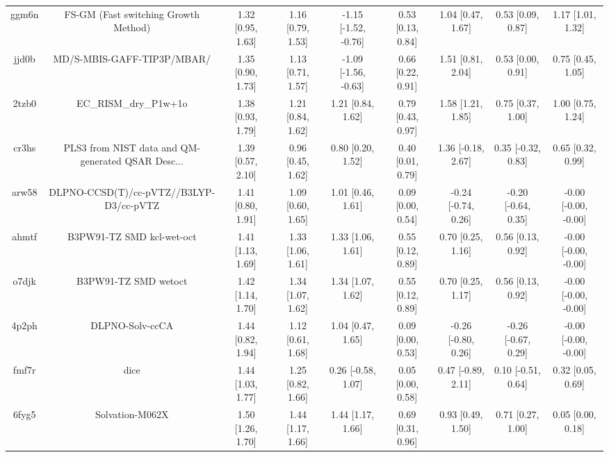\documentclass{article}
\begin{document}
\begin{center}
\begin{longtable}{|ccccccccc|}
 ggm6n &               FS-GM (Fast switching Growth Method) &  1.32 [0.95, 1.63] &  1.16 [0.79, 1.53] &  -1.15 [-1.52, -0.76] &  0.53 [0.13, 0.84] &    1.04 [0.47, 1.67] &    0.53 [0.09, 0.87] &     1.17 [1.01, 1.32] \\
 jjd0b &                         MD/S-MBIS-GAFF-TIP3P/MBAR/ &  1.35 [0.90, 1.73] &  1.13 [0.71, 1.57] &  -1.09 [-1.56, -0.63] &  0.66 [0.22, 0.91] &    1.51 [0.81, 2.04] &    0.53 [0.00, 0.91] &     0.75 [0.45, 1.05] \\
 2tzb0 &                              EC\_RISM\_dry\_P1w+1o &  1.38 [0.93, 1.79] &  1.21 [0.84, 1.62] &     1.21 [0.84, 1.62] &  0.79 [0.43, 0.97] &    1.58 [1.21, 1.85] &    0.75 [0.37, 1.00] &     1.00 [0.75, 1.24] \\
 cr3hs &  PLS3 from NIST data and QM-generated QSAR Desc... &  1.39 [0.57, 2.10] &  0.96 [0.45, 1.62] &     0.80 [0.20, 1.52] &  0.40 [0.01, 0.79] &   1.36 [-0.18, 2.67] &   0.35 [-0.32, 0.83] &     0.65 [0.32, 0.99] \\
 arw58 &            DLPNO-CCSD(T)/cc-pVTZ//B3LYP-D3/cc-pVTZ &  1.41 [0.80, 1.91] &  1.09 [0.60, 1.65] &     1.01 [0.46, 1.61] &  0.09 [0.00, 0.54] &  -0.24 [-0.74, 0.26] &  -0.20 [-0.64, 0.35] &  -0.00 [-0.00, -0.00] \\
 ahmtf &                          B3PW91-TZ SMD kcl-wet-oct &  1.41 [1.13, 1.69] &  1.33 [1.06, 1.61] &     1.33 [1.06, 1.61] &  0.55 [0.12, 0.89] &    0.70 [0.25, 1.16] &    0.56 [0.13, 0.92] &  -0.00 [-0.00, -0.00] \\
 o7djk &                               B3PW91-TZ SMD wetoct &  1.42 [1.14, 1.70] &  1.34 [1.07, 1.62] &     1.34 [1.07, 1.62] &  0.55 [0.12, 0.89] &    0.70 [0.25, 1.17] &    0.56 [0.13, 0.92] &  -0.00 [-0.00, -0.00] \\
 4p2ph &                                    DLPNO-Solv-ccCA &  1.44 [0.82, 1.94] &  1.12 [0.61, 1.68] &     1.04 [0.47, 1.65] &  0.09 [0.00, 0.53] &  -0.26 [-0.80, 0.26] &  -0.26 [-0.67, 0.29] &  -0.00 [-0.00, -0.00] \\
 fmf7r &                                               dice &  1.44 [1.03, 1.77] &  1.25 [0.82, 1.66] &    0.26 [-0.58, 1.07] &  0.05 [0.00, 0.58] &   0.47 [-0.89, 2.11] &   0.10 [-0.51, 0.64] &     0.32 [0.05, 0.69] \\
 6fyg5 &                                    Solvation-M062X &  1.50 [1.26, 1.70] &  1.44 [1.17, 1.66] &     1.44 [1.17, 1.66] &  0.69 [0.31, 0.96] &    0.93 [0.49, 1.50] &    0.71 [0.27, 1.00] &     0.05 [0.00, 0.18] \\

\end{longtable}
\end{center}
\end{document}
